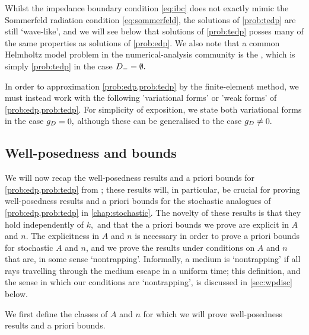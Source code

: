 Whilst the impedance boundary condition \eqref{eq:ibc} does not exactly mimic the Sommerfeld radiation condition \eqref{eq:sommerfeld}, the solutions of \cref{prob:tedp} are still `wave-like', and we will see below that solutions of \cref{prob:tedp} posses many of the same properties as solutions of \cref{prob:edp}. We also note that a common Helmholtz model problem in the numerical-analysis community is the , which is simply \cref{prob:tedp} in the case $D_{-} = \emptyset.$

In order to approximation \cref{prob:edp,prob:tedp} by the finite-element method, we must instead work with the following 'variational forms' or 'weak forms' of \cref{prob:edp,prob:tedp}. For simplicity of exposition, we state both variational forms in the case $g_{D} = 0,$ although these can be generalised to the case $g_{D} \neq 0.$



  \subsection{Well-posedness and bounds}\label{sec:wpbounds}

  We will now recap the well-posedness results and a priori bounds for \cref{prob:edp,prob:tedp} from \cite{GrPeSp:19}; these results will, in particular, be crucial for proving well-posedness results and a priori bounds for the stochastic analogues of \cref{prob:edp,prob:tedp} in \cref{chap:stochastic}. The novelty of these results is that they hold independently of $k,$ and that the a priori bounds we prove are explicit in $A$ and $n$. The explicitness in $A$ and $n$ is necessary in order to prove a priori bounds for stochastic $A$ and $n$, and we prove the results under conditions on $A$ and $n$ that are, in some sense `nontrapping'. Informally, a medium is `nontrapping' if all rays travelling through the medium escape in a uniform time; this definition, and the sense in which our conditions are `nontrapping', is discussed in \cref{sec:wpdisc} below.

  We first define the classes of $A$ and $n$ for which we will prove well-posedness results and a priori bounds.%


